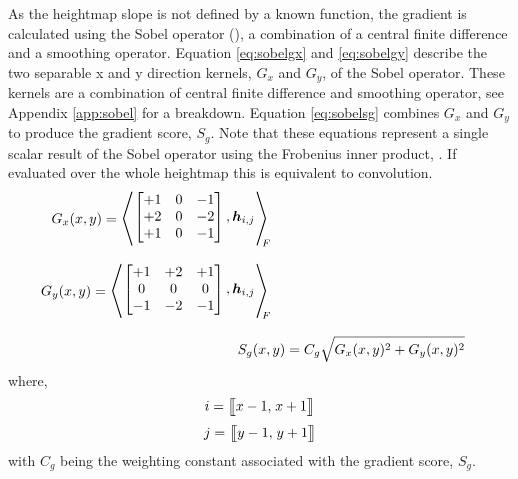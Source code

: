         As the heightmap slope is not defined by a known function, the gradient is calculated using the Sobel
        operator (\cite{sobel2014}), a combination of a central finite difference and a smoothing operator.
        \newpage
        \noindent
        Equation \ref{eq:sobelgx} and \ref{eq:sobelgy} describe the two separable x and y direction kernels, \(G_x\) and \(G_y\),
        of the Sobel operator. These kernels are a combination of central finite difference and smoothing operator, see Appendix \ref{app:sobel} 
        for a breakdown. Equation \ref{eq:sobelsg} combines \(G_x\) and \(G_y\) to produce the gradient score, \(S_g\). Note that these equations represent
        a single scalar result of the Sobel operator using the Frobenius inner product, \cite{horn2012matrix}. If evaluated over the whole heightmap this is equivalent
        to convolution.
        \begin{align}
            \begin{split} \label{eq:sobelgx}
                G_x(x,y) &= 
                        \sbox0{$
                        \begin{bmatrix}
                            +1 & 0 & -1\\
                            +2 & 0 & -2\\
                            +1 & 0 & -1
                        \end{bmatrix}
                        ,\boldsymbol{h}_{i,j}
                        $}
                        \mathopen{\resizebox{1.2\width}{1.1\ht0}{$\Bigg\langle$}}
                        \raisebox{0.08\ht0}{\usebox{0}}
                        \mathclose{\resizebox{1.2\width}{1.1\ht0}{$\Bigg\rangle$}}_{\mkern-10mu F}
            \end{split}\\[0.3cm]
            \begin{split} \label{eq:sobelgy}
                G_y(x,y) &= 
                        \sbox0{$
                        \begin{bmatrix}
                            +1 & +2 & +1\\
                            0 & 0 & 0\\
                            -1 & -2 & -1
                        \end{bmatrix}
                        ,\boldsymbol{h}_{i,j}
                        $}
                        \mathopen{\resizebox{1.2\width}{1.1\ht0}{$\Bigg\langle$}}
                        \raisebox{0.08\ht0}{\usebox{0}}
                        \mathclose{\resizebox{1.2\width}{1.1\ht0}{$\Bigg\rangle$}}_{\mkern-10mu F}
            \end{split}\\[0.3cm]
            S_g(x,y) &= C_g\sqrt{G_x(x,y)^2 + G_y(x,y)^2} \label{eq:sobelsg}
        \end{align}
        where,
        \[i = \big[\mkern-4.7mu\big[x-1,\mkern2mu x+1\big]\mkern-4.7mu\big]\]
        \[j = \big[\mkern-4.7mu\big[y-1,\mkern2mu y+1\big]\mkern-4.7mu\big]\]
        \noindent
        with \(C_g\) being the weighting constant associated with the gradient score, \(S_g\).
        
